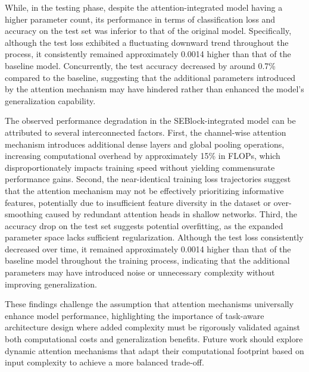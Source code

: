 \documentclass[conference]{IEEEtran}
\begin{document}
While, in the testing phase, despite the attention-integrated model having a higher parameter count, its performance in terms of classification loss and accuracy on the test set was inferior to that of the original model. Specifically, although the test loss exhibited a fluctuating downward trend throughout the process, it consistently remained approximately 0.0014 higher than that of the baseline model. Concurrently, the test accuracy decreased by around 0.7\% compared to the baseline, suggesting that the additional parameters introduced by the attention mechanism may have hindered rather than enhanced the model's generalization capability.

The observed performance degradation in the SEBlock-integrated model can be attributed to several interconnected factors. First, the channel-wise attention mechanism introduces additional dense layers and global pooling operations, increasing computational overhead by approximately 15\% in FLOPs, which disproportionately impacts training speed without yielding commensurate performance gains. Second, the near-identical training loss trajectories suggest that the attention mechanism may not be effectively prioritizing informative features, potentially due to insufficient feature diversity in the dataset or over-smoothing caused by redundant attention heads in shallow networks. Third, the accuracy drop on the test set suggests potential overfitting, as the expanded parameter space lacks sufficient regularization. Although the test loss consistently decreased over time, it remained approximately 0.0014 higher than that of the baseline model throughout the training process, indicating that the additional parameters may have introduced noise or unnecessary complexity without improving generalization. 

These findings challenge the assumption that attention mechanisms universally enhance model performance, highlighting the importance of task-aware architecture design where added complexity must be rigorously validated against both computational costs and generalization benefits. Future work should explore dynamic attention mechanisms that adapt their computational footprint based on input complexity to achieve a more balanced trade-off.
\end{document}
